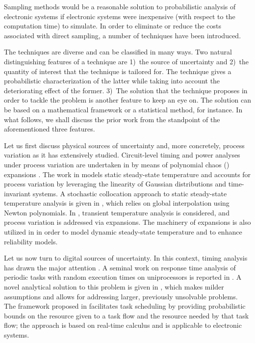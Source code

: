 Sampling methods would be a reasonable solution to probabilistic analysis of
electronic systems if electronic systems were inexpensive (with respect to the
computation time) to simulate. In order to eliminate or reduce the costs
associated with direct sampling, a number of techniques have been introduced.

The techniques are diverse and can be classified in many ways. Two natural
distinguishing features of a technique are 1)~the source of uncertainty and
2)~the quantity of interest that the technique is tailored for. The technique
gives a probabilistic characterization of the latter while taking into account
the deteriorating effect of the former. 3)~The solution that the technique
proposes in order to tackle the problem is another feature to keep an eye on.
The solution can be based on a mathematical framework or a statistical method,
for instance. In what follows, we shall discuss the prior work from the
standpoint of the aforementioned three features.

Let us first discuss physical sources of uncertainty and, more concretely,
process variation as it has extensively studied. Circuit-level timing and power
analyses under process variation are undertaken in \cite{bhardwaj2008} by means
of polynomial chaos () expansions \cite{xiu2010}. The work in
\cite{juan2012} models static steady-state temperature and accounts for process
variation by leveraging the linearity of Gaussian distributions and
time-invariant systems. A stochastic collocation \cite{xiu2010} approach to
static steady-state temperature analysis is given in \cite{lee2013}, which
relies on global interpolation using Newton polynomials. In \cite{ukhov2014},
transient temperature analysis is considered, and process variation is addressed
via  expansions. The machinery of  expansions is also utilized in
\cite{ukhov2015} in order to model dynamic steady-state temperature
\cite{ukhov2012} and to enhance reliability models.

Let us now turn to digital sources of uncertainty. In this context, timing
analysis has drawn the major attention \cite{quinton2012}. A seminal work on
response time analysis of periodic tasks with random execution times on
uniprocessors is reported in \cite{diaz2002}. A novel analytical solution to
this problem is given in \cite{tanasa2015}, which makes milder assumptions and
allows for addressing larger, previously unsolvable problems. The framework
proposed in \cite{santinelli2011} facilitates task scheduling by providing
probabilistic bounds on the resource given to a task flow and the resource
needed by that task flow; the approach is based on real-time calculus and is
applicable to electronic systems.

